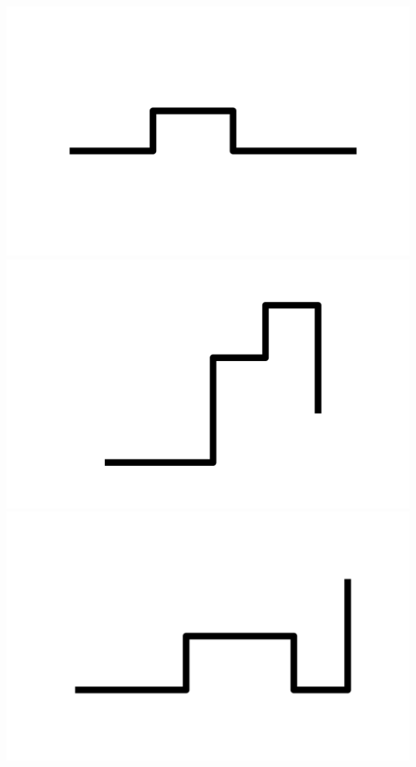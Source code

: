 \documentclass[]{report}
\begin{document}
\includegraphics[scale=.1]{pictures/17/state_cluster_shapes_13.pdf} 
\includegraphics[scale=.1]{pictures/17/state_cluster_shapes_14.pdf} 
\includegraphics[scale=.1]{pictures/17/state_cluster_shapes_15.pdf} 
\end{document}
